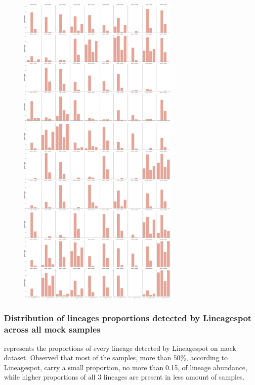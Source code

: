         \begin{figure}[H]
        	\centering
            \includegraphics[width=0.7\textwidth]{figures/further/bars-ba2-all.png}
            \label{fig:further:bars-ba2-all}
        \end{figure}
        
       \subsubsection{Distribution of lineages proportions detected by Lineagespot across all mock samples}  
         represents the proportions of every lineage detected by Lineagespot on mock dataset. Observed that most of the samples, more than 50\%, according to Lineagespot, carry a small proportion, no more than 0.15, of lineage abundance, while higher proportions of all 3 lineages are present in less amount of samples. 
        
